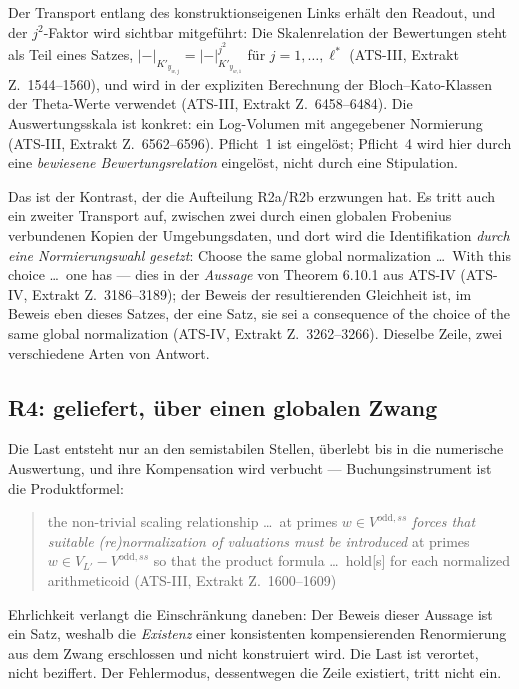 \documentclass[11pt,a4paper]{article}
\theoremstyle{definition}
\newcommand{\anchor}[2]{(#1, Extrakt Z.~#2)}
\begin{document}
Der Transport entlang des konstruktionseigenen Links erhält den Readout, und der
$j^2$-Faktor wird sichtbar mitgeführt: Die Skalenrelation der Bewertungen steht
als Teil eines Satzes, $|-|_{K'_{y_{w,j}}} = |-|^{j^2}_{K'_{y_{w,1}}}$ für
$j = 1,\dots,\ell^*$ \anchor{ATS-III}{1544--1560}, und wird in der expliziten
Berechnung der Bloch--Kato-Klassen der Theta-Werte verwendet
\anchor{ATS-III}{6458--6484}. Die Auswertungsskala ist konkret: ein Log-Volumen
mit angegebener Normierung \anchor{ATS-III}{6562--6596}. Pflicht~1 ist eingelöst;
Pflicht~4 wird hier durch eine \emph{bewiesene Bewertungsrelation} eingelöst,
nicht durch eine Stipulation.

Das ist der Kontrast, der die Aufteilung R2a/R2b erzwungen hat. Es tritt auch ein
zweiter Transport auf, zwischen zwei durch einen globalen Frobenius verbundenen
Kopien der Umgebungsdaten, und dort wird die Identifikation \emph{durch eine
Normierungswahl gesetzt}: \glqq Choose the same global normalization \dots\ With this
choice \dots\ one has\grqq{} --- dies in der \emph{Aussage} von Theorem 6.10.1 aus
ATS-IV \anchor{ATS-IV}{3186--3189}; der Beweis der resultierenden Gleichheit ist,
im Beweis eben dieses Satzes, der eine Satz, sie sei \glqq a consequence of the choice
of the same global normalization\grqq{} \anchor{ATS-IV}{3262--3266}. Dieselbe Zeile,
zwei verschiedene Arten von Antwort.

\subsection{R4: geliefert, über einen globalen Zwang}

Die Last entsteht nur an den semistabilen Stellen, überlebt bis in die numerische
Auswertung, und ihre Kompensation wird verbucht --- Buchungsinstrument ist die
Produktformel:

\begin{quote}\small
\glqq the non-trivial scaling relationship \dots\ at primes $w \in
V^{\mathrm{odd},ss}$ \emph{forces that suitable (re)normalization of valuations
must be introduced} at primes $w \in V_{L'} - V^{\mathrm{odd},ss}$ so that the
product formula \dots\ hold[s] for each normalized arithmeticoid\grqq
\hfill\anchor{ATS-III}{1600--1609}
\end{quote}

Ehrlichkeit verlangt die Einschränkung daneben: Der Beweis dieser Aussage ist ein
Satz, weshalb die \emph{Existenz} einer konsistenten kompensierenden Renormierung
aus dem Zwang erschlossen und nicht konstruiert wird. Die Last ist verortet, nicht
beziffert. Der Fehlermodus, dessentwegen die Zeile existiert, tritt nicht ein.
\end{document}
